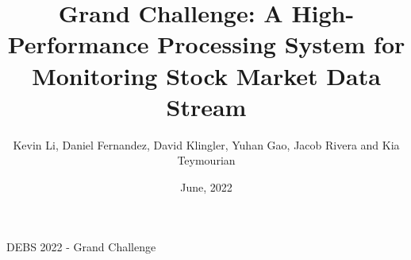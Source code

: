 \documentclass[9pt]{beamer}
\title{Grand Challenge: A High-Performance Processing System for Monitoring Stock Market Data Stream}
\date{June, 2022}
\author{Kevin Li, Daniel Fernandez, David Klingler, Yuhan Gao, Jacob Rivera and Kia Teymourian}
\institute{The University of Texas at Austin}
\institute{Group 17}
\begin{document}
\maketitle








\begin{frame}[fragile]{DEBS 2022 - Grand Challenge }







\end{frame}

\begin{frame}[fragile]{ }






\end{frame}





\begin{frame}[fragile]{ }








    
\end{frame}




\begin{frame}[fragile]{ }





    
\end{frame}
\end{document}
